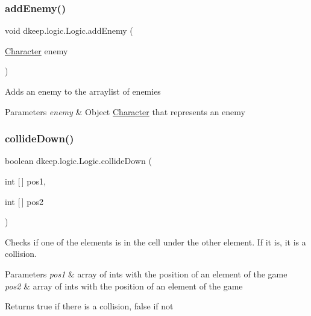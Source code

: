 \subsubsection{\texorpdfstring{add\+Enemy()}{addEnemy()}}
{\footnotesize\ttfamily void dkeep.\+logic.\+Logic.\+add\+Enemy (\begin{DoxyParamCaption}\item[{\hyperlink{classdkeep_1_1logic_1_1_character}{Character}}]{enemy }\end{DoxyParamCaption})}

Adds an enemy to the arraylist of enemies 
\begin{DoxyParams}{Parameters}
{\em enemy} & Object \hyperlink{classdkeep_1_1logic_1_1_character}{Character} that represents an enemy \\
\hline
\end{DoxyParams}
\mbox{\label{classdkeep_1_1logic_1_1_logic_a8918f9ee21260104e05bf39c43782e70}} 
\subsubsection{\texorpdfstring{collide\+Down()}{collideDown()}}
{\footnotesize\ttfamily boolean dkeep.\+logic.\+Logic.\+collide\+Down (\begin{DoxyParamCaption}\item[{int \mbox{[}$\,$\mbox{]}}]{pos1,  }\item[{int \mbox{[}$\,$\mbox{]}}]{pos2 }\end{DoxyParamCaption})}

Checks if one of the elements is in the cell under the other element. If it is, it is a collision. 
\begin{DoxyParams}{Parameters}
{\em pos1} & array of ints with the position of an element of the game \\
\hline
{\em pos2} & array of ints with the position of an element of the game \\
\hline
\end{DoxyParams}
\begin{DoxyReturn}{Returns}
true if there is a collision, false if not 
\end{DoxyReturn}
\mbox{\label{classdkeep_1_1logic_1_1_logic_aa038077e7e65bd2d047a125c5a7e6185}} 
